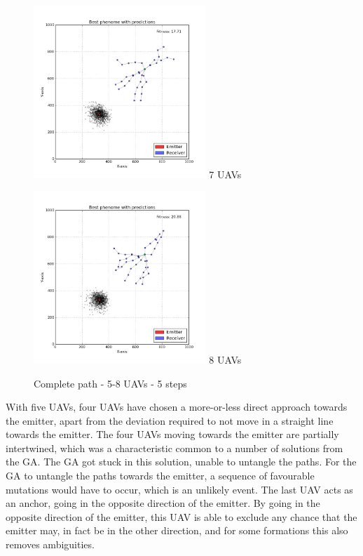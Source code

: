 \documentclass[10pt,a4paper]{book}
\begin{document}
\begin{figure}[H]
\begin{minipage}{60mm}
  \centering
\includegraphics[width=65mm]{uav6steps5.jpg}
  7 \glspl{UAV}
\end{minipage}
\begin{minipage}{60mm}
  \centering
\includegraphics[width=65mm]{uav7steps5.jpg}
  8 \glspl{UAV}
\end{minipage}
\caption{Complete path - 5-8 \glspl{UAV} - 5 steps}
\label{FIG_CP_4_7}
\end{figure}


With five \glspl{UAV}, four \glspl{UAV} have chosen a more-or-less direct approach towards the emitter, apart from the deviation required to not move in a straight line towards the emitter. The four \glspl{UAV} moving towards the emitter are partially intertwined, which was a characteristic common to a number of solutions from the \gls{GA}. The \gls{GA} got stuck in this solution, unable to untangle the paths. For the \gls{GA} to untangle the paths towards the emitter, a sequence of favourable mutations would have to occur, which is an unlikely event. The last \gls{UAV} acts as an anchor, going in the opposite direction of the emitter. By going in the opposite direction of the emitter, this \gls{UAV} is able to exclude any chance that the emitter may, in fact be in the other direction, and for some formations this also removes ambiguities. 
\end{document}
